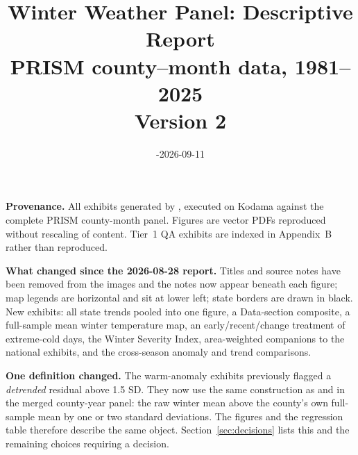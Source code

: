\documentclass[11pt, english, letterpaper]{article}
\begin{document}
\title{Winter Weather Panel: Descriptive Report\\[4pt]
\large PRISM county--month data, 1981--2025 \\[2pt]
\normalsize Version 2}
\date{-2026-09-11}
\maketitle
\thispagestyle{empty}
\vspace{-1em}
\begin{center}\begin{minipage}{0.86\textwidth}\small
\textbf{Provenance.} All exhibits generated by
, executed on Kodama against the
complete PRISM county-month panel. Figures are vector PDFs reproduced without
rescaling of content. Tier~1 QA exhibits are indexed in Appendix~B rather than
reproduced.
\par\vspace{6pt}
\textbf{What changed since the 2026-08-28 report.} Titles and source notes have been
removed from the images and the notes now appear beneath each figure; map legends are
horizontal and sit at lower left; state borders are drawn in black. New exhibits: all
state trends pooled into one figure, a Data-section composite, a full-sample mean
winter temperature map, an early/recent/change treatment of extreme-cold days, the
Winter Severity Index, area-weighted companions to the national exhibits, and the
cross-season anomaly and trend comparisons.
\par\vspace{6pt}
\textbf{One definition changed.} The warm-anomaly exhibits previously flagged a
\emph{detrended} residual above 1.5 SD. They now use the same construction as
 and  in the merged county-year panel:
the raw winter mean above the county's own full-sample mean by one or two standard
deviations. The figures and the regression table therefore describe the same object.
Section~\ref{sec:decisions} lists this and the remaining choices requiring a decision.
\end{minipage}\end{center}
\newpage
\tableofcontents
\newpage
\end{document}
